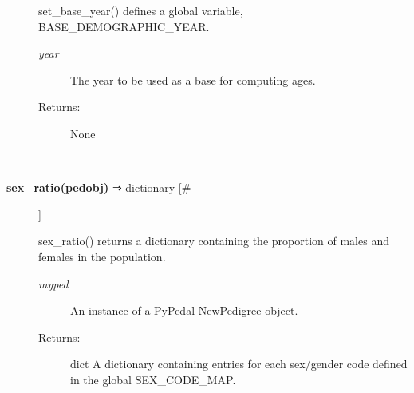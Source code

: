 \begin{description}
 set\_base\_year() defines a global variable, BASE\_DEMOGRAPHIC\_YEAR.
\begin{description}
\item[\emph{year}
] The year to be used as a base for computing ages.
\item[Returns:] None

\end{description}
\\ 

\item[\textbf{sex\_ratio(pedobj)}
 ⇒ dictionary [\#]]

 sex\_ratio() returns a dictionary containing the proportion of males and females in the population.
\begin{description}
\item[\emph{myped}
] An instance of a PyPedal NewPedigree object.
\item[Returns:] dict A dictionary containing entries for each sex/gender code defined in the global SEX\_CODE\_MAP.

\end{description}
\\ 


\end{description}


